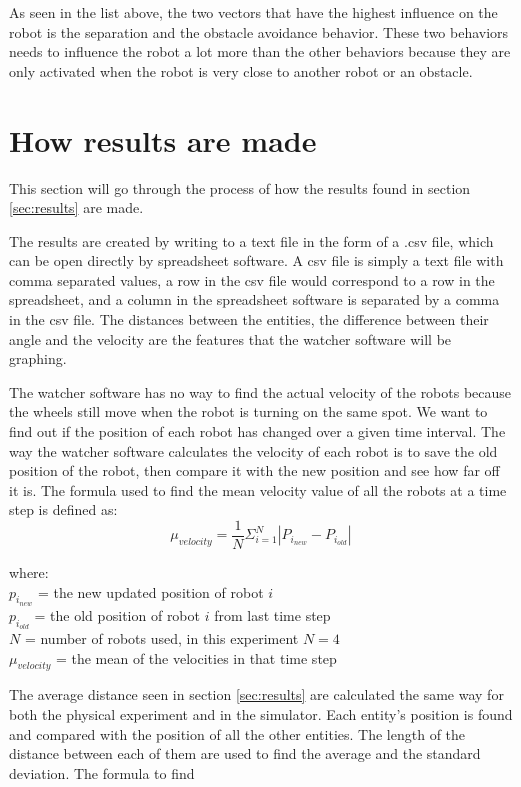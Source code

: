 As seen in the list above, the two vectors that have the highest influence on the robot is the separation and the obstacle avoidance behavior. These two behaviors needs to influence the robot a lot more than the other behaviors because they are only activated when the robot is very close to another robot or an obstacle.

\section{How results are made}
\label{sec:makeres}
This section will go through the process of how the results found in section \ref{sec:results} are made.

The results are created by writing to a text file in the form of a .csv file, which can be open directly by spreadsheet software. A csv file is simply a text file with comma separated values, a row in the csv file would correspond to a row in the spreadsheet, and a column in the spreadsheet software is separated by a comma in the csv file. The distances between the entities, the difference between their angle and the velocity are the features that the watcher software will be graphing.

The watcher software has no way to find the actual velocity of the robots because the wheels still move when the robot is turning on the same spot. We want to find out if the position of each robot has changed over a given time interval.
The way the watcher software calculates the velocity of each robot is to save the old position of the robot, then compare it with the new position and see how far off it is.
The formula used to find the mean velocity value of all the robots at a time step is defined as:
\begin{equation}
\label{eq:muvel}
\mu_{velocity} = \frac{1}{N} \Sigma_{i=1}^N |P_{i_{new}} - P_{i_{old}}|
\end{equation}

where:
\\
$p_{i_{new}}$ = the new updated position of robot $i$
\\
$p_{i_{old}}$ = the old position of robot $i$ from last time step
\\
$N$ = number of robots used, in this experiment $N = 4$ 
\\
$\mu_{velocity}$ = the mean of the velocities in that time step

The average distance seen in section \ref{sec:results} are calculated the same way for both the physical experiment and in the simulator. Each entity's position is found and compared with the position of all the other entities. The length of the distance between each of them are used to find the average and the standard deviation.
The formula to find 

